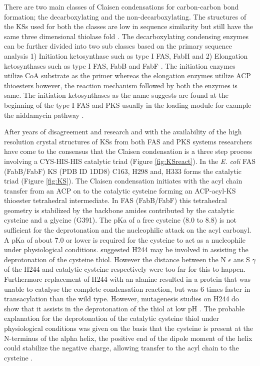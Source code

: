 			There are two main classes of Claisen condensations for carbon-carbon bond formation; the decarboxylating and the non-decarboxylating. The structures of the KSs used for both the classes are low in sequence similarity but still have the same three dimensional thiolase fold \parencite{Heath2002}. The decarboxylating condensing enzymes can be further divided into two sub classes based on the primary sequence analysis 1) Initiation ketosynthase such as type I FAS, FabH  and 2) Elongation ketosynthases such as type I FAS, FabB and FabF \parencite{Davies2000}. The initiation enzymes utilize CoA substrate as the primer whereas the elongation enzymes utilize ACP thioesters however, the reaction mechanism followed by both the enzymes is same. The initiation ketosynthases as the name suggests are found at the beginning of the type I FAS and PKS usually in the loading module for example the niddamycin pathway \parencite{Kakavas1997}.
			
			After years of disagreement and research and with the availability of the high resolution crystal structures of KSs from both FAS and PKS systems researchers have come to the consensus that the Claisen condensation is a three step process involving a CYS-HIS-HIS catalytic triad (Figure \ref{fig:KSreact}). In the \textit{E. coli} FAS (FabB/FabF) KS (PDB ID 1DD8) C163, H298 and, H333 forms the catalytic triad (Figure \ref{fig:KS}). The Claisen condensation initiates with the acyl chain transfer from an ACP on to the catalytic cysteine forming an ACP-acyl-KS thioester tetrahedral intermediate. In FAS (FabB/FabF) this tetrahedral geometry is stabilized by the backbone amides contributed by the catalytic cysteine and a glycine (G391). The pKa of a free cysteine (8.0 to 8.8) is not sufficient for the deprotonation and the nucleophilic attack on the acyl carbonyl. A pKa of about 7.0 or lower is required for the cysteine to act as a nucleophile under physiological conditions. \textcite{Qiu1999} suggested H244 may be involved in assisting the deprotonation of the cysteine thiol. However the distance between the N $\epsilon$ ans S $\gamma$ of the H244 and catalytic cysteine respectively were too far for this to happen. Furthermore replacement of H244 with an alanine resulted in a protein that was unable to catalyse the complete condensation reaction, but was 6 times faster in transacylation than the wild type. However, mutagenesis studies on H244 do show that it assists in the deprotonation of the thiol at low pH \parencite{Davies2000}. The probable explanation for the deprotonation of the catalytic cysteine thiol under physiological conditions was given on the basis that the cysteine is present at the N-terminus of the alpha helix, the positive end of the dipole moment of the helix could stabilize the negative charge, allowing transfer to the acyl chain to the cysteine \parencite{Davies2000}.

